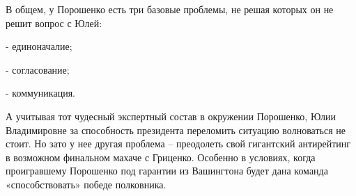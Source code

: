 В общем, у Порошенко есть три базовые проблемы, не решая которых он не решит
вопрос с Юлей:

- единоначалие;

- согласование;

- коммуникация.

А учитывая тот чудесный экспертный состав в окружении Порошенко, Юлии
Владимировне за способность президента переломить ситуацию волноваться не
стоит. Но зато у нее другая проблема – преодолеть свой гигантский антирейтинг в
возможном финальном махаче с Гриценко. Особенно в условиях, когда проигравшему
Порошенко под гарантии из Вашингтона будет дана команда «способствовать» победе
полковника.

